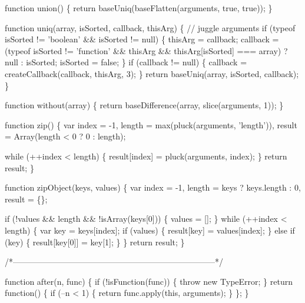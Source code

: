 \begin{DoxyCodeInclude}
{{  \textcolor{keyword}{function} \textcolor{keyword}{union}() \{
    \textcolor{keywordflow}{return} baseUniq(baseFlatten(arguments, \textcolor{keyword}{true}, \textcolor{keyword}{true}));
  \}

  \textcolor{keyword}{function} uniq(array, isSorted, callback, thisArg) \{
    \textcolor{comment}{// juggle arguments}
    \textcolor{keywordflow}{if} (typeof isSorted != \textcolor{stringliteral}{'boolean'} && isSorted != null) \{
      thisArg = callback;
      callback = (typeof isSorted != \textcolor{stringliteral}{'function'} && thisArg && thisArg[isSorted] === array) ? null : 
      isSorted;
      isSorted = \textcolor{keyword}{false};
    \}
    \textcolor{keywordflow}{if} (callback != null) \{
      callback = createCallback(callback, thisArg, 3);
    \}
    \textcolor{keywordflow}{return} baseUniq(array, isSorted, callback);
  \}

  \textcolor{keyword}{function} without(array) \{
    \textcolor{keywordflow}{return} baseDifference(array, slice(arguments, 1));
  \}

  \textcolor{keyword}{function} zip() \{
    var index = -1,
        length = max(pluck(arguments, \textcolor{stringliteral}{'length'})),
        result = Array(length < 0 ? 0 : length);

    \textcolor{keywordflow}{while} (++index < length) \{
      result[index] = pluck(arguments, index);
    \}
    \textcolor{keywordflow}{return} result;
  \}

  \textcolor{keyword}{function} zipObject(keys, values) \{
    var index = -1,
        length = keys ? keys.length : 0,
        result = \{\};

    \textcolor{keywordflow}{if} (!values && length && !isArray(keys[0])) \{
      values = [];
    \}
    \textcolor{keywordflow}{while} (++index < length) \{
      var key = keys[index];
      \textcolor{keywordflow}{if} (values) \{
        result[key] = values[index];
      \} \textcolor{keywordflow}{else} \textcolor{keywordflow}{if} (key) \{
        result[key[0]] = key[1];
      \}
    \}
    \textcolor{keywordflow}{return} result;
  \}

  \textcolor{comment}{/*--------------------------------------------------------------------------*/}

  \textcolor{keyword}{function} after(n, func) \{
    \textcolor{keywordflow}{if} (!isFunction(func)) \{
      \textcolor{keywordflow}{throw} \textcolor{keyword}{new} TypeError;
    \}
    \textcolor{keywordflow}{return} \textcolor{keyword}{function}() \{
      \textcolor{keywordflow}{if} (--n < 1) \{
        \textcolor{keywordflow}{return} func.apply(\textcolor{keyword}{this}, arguments);
      \}
    \};
  \}

}}
\end{DoxyCodeInclude}
